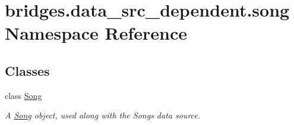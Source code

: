 \hypertarget{namespacebridges_1_1data__src__dependent_1_1song}{}\section{bridges.\+data\+\_\+src\+\_\+dependent.\+song Namespace Reference}
\label{namespacebridges_1_1data__src__dependent_1_1song}
\subsection*{Classes}
\begin{DoxyCompactItemize}
\item 
class \hyperlink{classbridges_1_1data__src__dependent_1_1song_1_1_song}{Song}
\begin{DoxyCompactList}\small\item\em A \hyperlink{classbridges_1_1data__src__dependent_1_1song_1_1_song}{Song} object, used along with the Songs data source. \end{DoxyCompactList}\end{DoxyCompactItemize}
